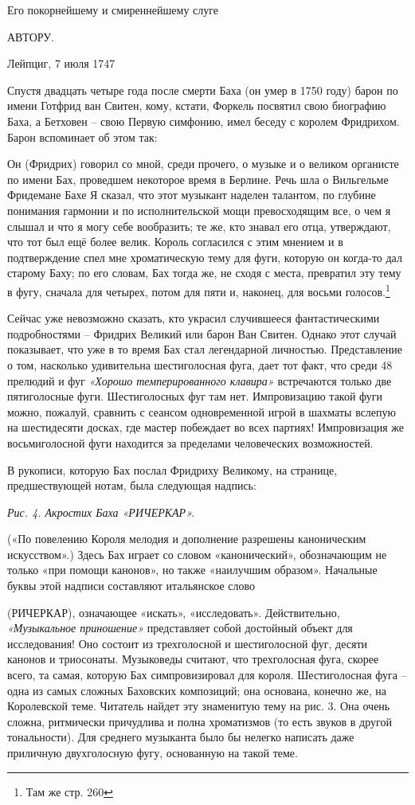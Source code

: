 \documentclass[../main.tex]{subfiles}
\begin{document}
Его покорнейшему и смиреннейшему слуге

АВТОРУ.

Лейпциг, 7 июля 1747

Спустя двадцать четыре года после смерти Баха (он умер в 1750 году) барон по имени Готфрид ван Свитен, кому, кстати, Форкель посвятил свою биографию Баха, а Бетховен \--- свою Первую симфонию, имел беседу с королем Фридрихом. Барон вспоминает об этом так:

Он (Фридрих) говорил со мной, среди прочего, о музыке и о великом органисте по имени Бах, проведшем некоторое время в Берлине. Речь шла о Вильгельме Фридемане Бахе Я сказал, что этот музыкант наделен талантом, по глубине понимания гармонии и по исполнительской мощи превосходящим все, о чем я слышал и что я могу себе вообразить; те же, кто знавал его отца, утверждают, что тот был ещё более велик. Король согласился с этим мнением и в подтверждение спел мне хроматическую тему для фуги, которую он когда-то дал старому Баху; по его словам, Бах тогда же, не сходя с места, превратил эту тему в фугу, сначала для четырех, потом для пяти и, наконец, для восьми голосов.\footnote{Там же стр. 260}

Сейчас уже невозможно сказать, кто украсил случившееся фантастическими подробностями \--- Фридрих Великий или барон Ван Свитен. Однако этот случай показывает, что уже в то время Бах стал легендарной личностью. Представление о том, насколько удивительна шестиголосная фуга, дает тот факт, что среди 48 прелюдий и фуг \emph{«Хорошо темперированного клавира»} встречаются только две пятиголосные фуги. Шестиголосных фуг там нет. Импровизацию такой фуги можно, пожалуй, сравнить с сеансом одновременной игрой в шахматы вслепую на шестидесяти досках, где мастер побеждает во всех партиях! Импровизация же восьмиголосной фуги находится за пределами человеческих возможностей.

В рукописи, которую Бах послал Фридриху Великому, на странице, предшествующей нотам, была следующая надпись:

\emph{Рис. 4. Акростих Баха «РИЧЕРКАР».}

(«По повелению Короля мелодия и дополнение разрешены каноническим искусством».) Здесь Бах играет со словом «канонический», обозначающим не только «при помощи канонов», но также «наилучшим образом». Начальные буквы этой надписи составляют итальянское слово
\begin{center}
    \foreignlanguage{english}{}
\end{center}
(РИЧЕРКАР), означающее «искать», «исследовать». Действительно, \emph{«Музыкальное приношение»} представляет собой достойный объект для исследования! Оно состоит из трехголосной и шестиголосной фуг, десяти канонов и триосонаты. Музыковеды считают, что трехголосная фуга, скорее всего, та самая, которую Бах симпровизировал для короля. Шестиголосная фуга \--- одна из самых сложных Баховских композиций; она основана, конечно же, на Королевской теме. Читатель найдет эту знаменитую тему на рис. 3. Она очень сложна, ритмически причудлива и полна хроматизмов (то есть звуков в другой тональности). Для среднего музыканта было бы нелегко написать даже приличную двухголосную фугу, основанную на такой теме.
\end{document}

